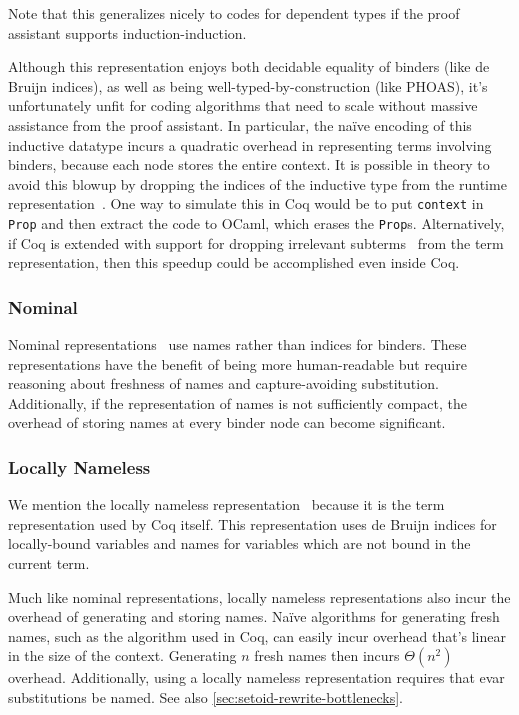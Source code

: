 Note that this generalizes nicely to codes for dependent types if the proof assistant supports induction-induction.

Although this representation enjoys both decidable equality of binders (like de Bruijn indices), as well as being well-typed-by-construction (like PHOAS), it's unfortunately unfit for coding algorithms that need to scale without massive assistance from the proof assistant.
In particular, the naïve encoding of this inductive datatype incurs a quadratic overhead in representing terms involving binders, because each node stores the entire context.
It is possible in theory to avoid this blowup by dropping the indices of the inductive type from the runtime representation~\cite{Inductive2003Brady}.
One way to simulate this in Coq would be to put \texttt{context} in \texttt{Prop} and then extract the code to OCaml, which erases the \texttt{Prop}s.
Alternatively, if Coq is extended with support for dropping irrelevant subterms~\cite{sprop} from the term representation, then this speedup could be accomplished even inside Coq.

\subsubsection{Nominal} \label{sec:binders:nominal}
Nominal representations~\cite{Nominal2003Pitts} use names rather than indices for binders.
These representations have the benefit of being more human-readable but require reasoning about freshness of names and capture-avoiding substitution.
Additionally, if the representation of names is not sufficiently compact, the overhead of storing names at every binder node can become significant.

\subsubsection{Locally Nameless} \label{sec:binders:locally-nameless}
We mention the locally nameless representation~\cite{Locally2012Chargueraud,locally2007Leroy} because it is the term representation used by Coq itself.
This representation uses de Bruijn indices for locally-bound variables and names for variables which are not bound in the current term.

Much like nominal representations, locally nameless representations also incur the overhead of generating and storing names.
Naïve algorithms for generating fresh names, such as the algorithm used in Coq, can easily incur overhead that's linear in the size of the context.
Generating $n$ fresh names then incurs $\mathcal \Theta(n^2)$ overhead.
Additionally, using a locally nameless representation requires that evar substitutions be named.
See also \autoref{sec:setoid-rewrite-bottlenecks}.


